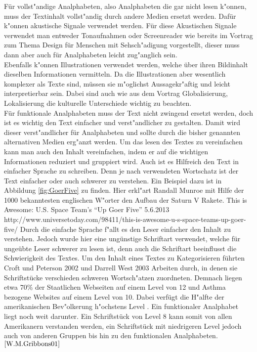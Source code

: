 Für vollst"andige Analphabeten, also Analphabeten die gar nicht lesen k"onnen, muss der Textinhalt vollst"andig durch andere Medien ersetzt werden. Dafür k"onnen akustische Signale verwendet werden. Für diese Akustischen Signale verwendet man entweder Tonaufnahmen oder Screenreader wie bereits im Vortrag zum Thema \glqq Design für Menschen mit Sehsch"adigung \grqq vorgestellt, dieser muss dann aber auch für Analphabeten leicht zug"anglich sein.\\
Ebenfalls k"onnen Illustrationen verwendet werden, welche über ihren Bildinhalt dieselben Informationen vermitteln.
Da die Illustrationen aber wesentlich komplexer als Texte sind, müssen sie m"oglichst Aussagekr"aftig und leicht interpretierbar sein. Dabei sind auch wie aus dem Vortrag \glqq Globalisierung, Lokalisierung \grqq die kulturelle Unterschiede wichtig zu beachten.\\
Für funktionale Analphabeten muss der Text nicht zwingend ersetzt werden, doch ist es wichtig den Text einfacher und verst"andlicher zu gestalten. Damit wird dieser verst"andlicher für Analphabeten und sollte durch die bisher genannten alternativen Medien erg"anzt werden. Um das lesen des Textes zu vereinfachen kann man auch den Inhalt vereinfachen, indem er auf die wichtigen Informationen
reduziert und gruppiert wird.
 Auch ist es Hilfreich den Text in einfacher Sprache zu schreiben. Denn je nach verwendeten Wortschatz ist der Text einfacher oder auch schwerer zu verstehen. Ein Beispiel dazu ist in Abbildung \ref{fig:GoerFive} zu finden. Hier erkl"art Randall Munroe mit Hilfe der 1000 bekanntesten englischen W"orter den Aufbau der Saturn V Rakete.
				{This is Awesome: U.S. Space Team’s “Up Goer Five”}
				{5.6.2013}
				{http://www.universetoday.com/98411/this-is-awesome-u-s-space-teams-up-goer-five/}
 Durch die einfache Sprache f"allt es den Leser einfacher den Inhalt zu verstehen. Jedoch wurde hier eine ungünstige Schriftart verwendet, welche für ungeübte Leser schwerer zu lesen ist, denn auch die Schriftart beeinflusst die Schwierigkeit des Textes.
Um den Inhalt eines Textes zu Kategorisieren führten Croft und Peterson 2002 und Darrell West 2003 Arbeiten durch, in denen sie Schriftstücke verschieden schweren Wortsch"atzen zuordneten.
Demnach liegen etwa 70\% der Staatlichen Webseiten auf einem Level von 12 und Asthma bezogene Websites auf einem Level von 10.
Dabei verfügt die H"alfte der amerikanischen Bev"olkerung h"ochstens Level . Ein funktionaler Analphabet liegt noch weit darunter.
Ein Schriftstück von Level 8 kann somit von allen Amerikanern verstanden werden, ein Schriftstück mit niedrigeren Level jedoch auch von anderen Gruppen bis hin zu den funktionalen Analphabeten.$^{\ref{W.M.Gribbons01}}$\\

